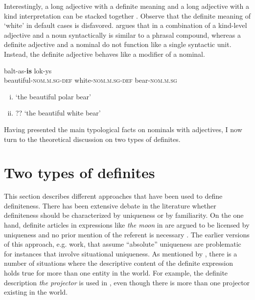 \documentclass[output=paper,
modfonts
]{langscibook}
\begin{document}
Interestingly, a long adjective with a definite meaning and a long adjective with a kind interpretation can be stacked together . Observe that the definite meaning of `white' in default cases is disfavored. \citet{Sereikaite2017} argues that in  a combination of a kind-level adjective and a noun syntactically is similar to a phrasal compound, whereas a definite adjective and a nominal do not function like a single syntactic unit. Instead, the definite adjective behaves like a modifier of a nominal. 

\begin{exe}
\ex \label{ex:sereikaite:12}
 {balt-as-\textbf{is}} {lok-ys} \\
beautiful-\textsc{nom.m.sg}-{\textsc{def}} white-\textsc{nom.m.sg}-{\textsc{def}} bear-\textsc{nom.m.sg} \\
\trans 
\begin{enumerate}[(i)]
	\item `the beautiful polar bear'\\
	\item ?? `the beautiful white bear' 
\end{enumerate}
\end{exe}



Having presented the main typological facts on nominals with adjectives, I now turn to the theoretical discussion on two types of definites.


\section{Two types of definites} \label{sec:sereikaite:3}

This section describes different approaches that have been used to define definiteness. There has been extensive debate in the literature whether definiteness should be characterized by uniqueness or by familiarity. On the one hand, definite articles in expressions like \textit{the moon} in  are argued to be licensed by uniqueness and no prior mention of the referent is necessary \citep{Russell1905,Strawson1950,Frege1892}. The earlier versions of this approach, e.g.  work, that assume ``absolute'' uniqueness are problematic for instances that involve situational uniqueness. As mentioned by \citet{Schwarz2013}, there is a number of situations where the descriptive content of the definite expression holds true for more than one entity in the world. For example, the definite description \textit{the projector} is used in , even though there is more than one projector existing in the world. 
\end{document}
